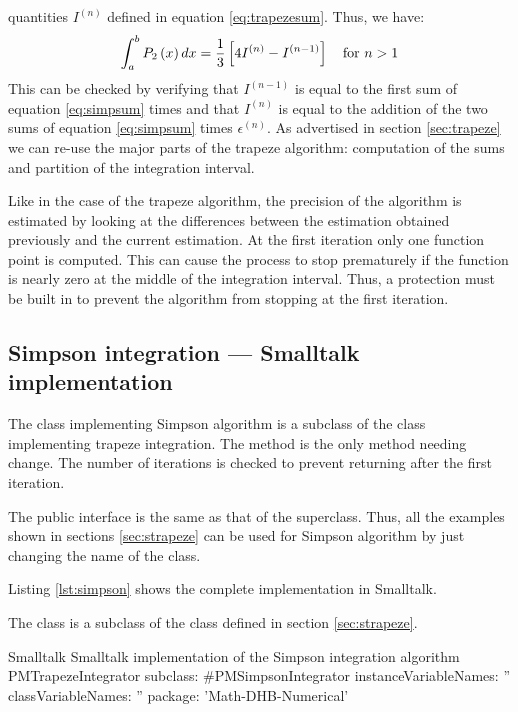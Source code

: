quantities $I^{\left(n\right)}$ defined in equation
\ref{eq:trapezesum}. Thus, we have:
\begin{equation}
  \int_a^b
P_2\left(x\right)dx={1 \over
3}\left[4I^{\left(n\right)}-I^{\left(n-1\right)}\right]
\mbox{\quad for $n>1$}
\end{equation}
This can be checked by verifying that $I^{\left(n-1\right)}$ is
equal to the first sum of equation \ref{eq:simpsum} times  and
that $I^{\left(n\right)}$  is equal to the addition of the two
sums of equation \ref{eq:simpsum} times
$\epsilon^{\left(n\right)}$. As advertised in section
\ref{sec:trapeze} we can re-use the major parts of the trapeze
algorithm: computation of the sums and partition of the
integration interval.

Like in the case of the trapeze algorithm, the precision of the
algorithm is estimated by looking at the differences between the
estimation obtained previously and the current estimation. At the
first iteration only one function point is computed. This can
cause the process to stop prematurely if the function is nearly
zero at the middle of the integration interval. Thus, a protection
must be built in to prevent the algorithm from stopping at the
first iteration.

\subsection{Simpson integration --- Smalltalk implementation}
\label{sec:sSimpson}
The class implementing Simpson algorithm is a subclass of the
class implementing trapeze integration.
The method  is the only method needing change.
The number of iterations is checked to prevent returning after the first
iteration.

The public interface is the same as that of the superclass.
Thus, all the examples shown in sections \ref{sec:strapeze} can be used for Simpson
algorithm by just changing the name of the class.

Listing \ref{lst:simpson} shows the complete implementation in Smalltalk.

The class  is a subclass of the class
 defined in section \ref{sec:strapeze}.

\begin{listing}[label=lst:simpson]{Smalltalk}
{Smalltalk implementation of the Simpson integration algorithm}
PMTrapezeIntegrator subclass: #PMSimpsonIntegrator
   instanceVariableNames: ''
   classVariableNames: ''
   package: 'Math-DHB-Numerical'
\end{listing}

